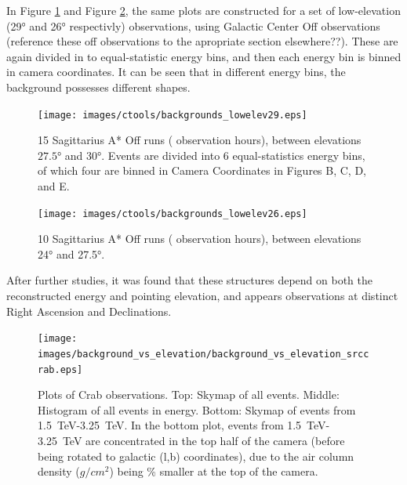     In Figure \ref{fig:back_lowelev29} and Figure \ref{fig:back_lowelev26}, the same plots are constructed for a set of low-elevation (\nicetilde{}\ang{29} and \nicetilde{}\ang{26} respectivly) observations, using Galactic Center Off observations (reference these off observations to the apropriate section elsewhere??).
    These are again divided in to equal-statistic energy bins, and then each energy bin is binned in camera coordinates.
    It can be seen that in different energy bins, the background possesses different shapes.

    \begin{figure}[ht]
      \centering
      \texttt{[image: images/ctools/backgrounds\_lowelev29.eps]}
      \caption[CTOOLS Background at \ang{29} Elevation]{
        15 Sagittarius A* Off runs ( observation hours), between elevations $ \ang{27.5} $ and $ \ang{30} $.
        Events are divided into 6 equal-statistics energy bins, of which four are binned in Camera Coordinates in Figures B, C, D, and E.
      }
      \label{fig:back_lowelev29}
    \end{figure}

    \begin{figure}[ht]
      \centering
      \texttt{[image: images/ctools/backgrounds\_lowelev26.eps]}
      \caption[CTOOLS Background at \ang{26} Elevation]{
        10 Sagittarius A* Off runs ( observation hours), between elevations \ang{24} and \ang{27.5}. 
      }
      \label{fig:back_lowelev26}
    \end{figure}
  
  After further studies, it was found that these structures depend on both the reconstructed energy and pointing elevation, and appears observations at distinct Right Ascension and Declinations.
  
  \begin{figure}[ht]
    \centering
    \texttt{[image: images/background\_vs\_elevation/background\_vs\_elevation\_srccrab.eps]}
    \caption[Background Vs Elevation Crab]
    {\small 
      Plots of Crab observations.
      Top: Skymap of all events.  Middle: Histogram of all events in energy.  Bottom: Skymap of events from \SI{1.5}{\TeV}-\SI{3.25}{\TeV}.  
      In the bottom plot, events from \SI{1.5}{\TeV}-\SI{3.25}{\TeV} are concentrated in the top half of the camera (before being rotated to galactic (l,b) coordinates), due to the air column density ($g/cm^2$) being \% smaller at the top of the camera.
    }
    \label{fig:bkgvsel_crab}
  \end{figure}

